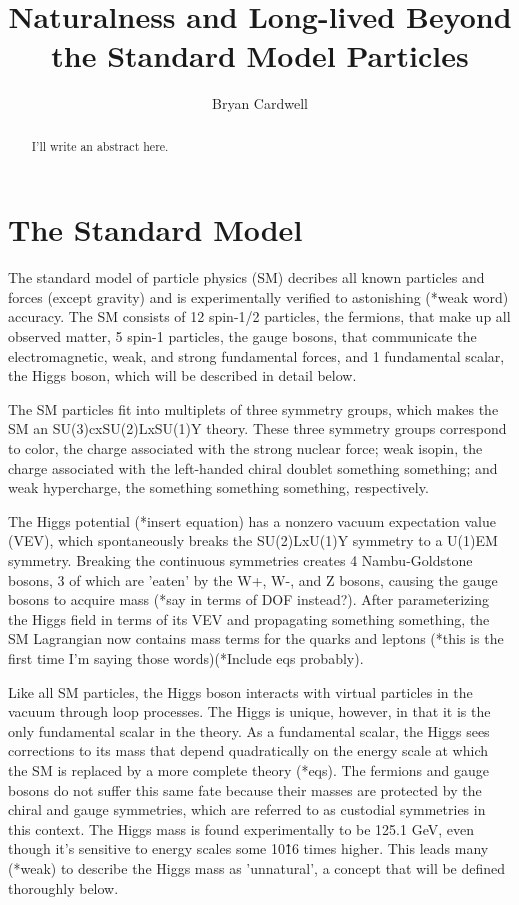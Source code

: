 \documentclass[12pt]{article}
\title{Naturalness and Long-lived Beyond the Standard Model Particles}
\author{Bryan Cardwell}
\begin{document}
\singlespacing

\maketitle

\begin{abstract}

I'll write an abstract here.

\end{abstract}

\doublespacing

\section{The Standard Model}
    The standard model of particle physics (SM) decribes all known particles and forces (except gravity) and is experimentally verified to astonishing (*weak word) accuracy. The SM consists of 12 spin-1/2 particles, the fermions, that make up all observed matter, 5 spin-1 particles, the gauge bosons, that communicate the electromagnetic, weak, and strong fundamental forces, and 1 fundamental scalar, the Higgs boson, which will be described in detail below.
    
    The SM particles fit into multiplets of three symmetry groups, which makes the SM an SU(3)cxSU(2)LxSU(1)Y theory. These three symmetry groups correspond to color, the charge associated with the strong nuclear force; weak isopin, the charge associated with the left-handed chiral doublet something something; and weak hypercharge, the something something something, respectively. 

    The Higgs potential (*insert equation) has a nonzero vacuum expectation value (VEV), which spontaneously breaks the SU(2)LxU(1)Y symmetry to a U(1)EM symmetry. Breaking the continuous symmetries creates 4 Nambu-Goldstone bosons, 3 of which are 'eaten' by the W+, W-, and Z bosons, causing the gauge bosons to acquire mass (*say in terms of DOF instead?). After parameterizing the Higgs field in terms of its VEV and propagating something something, the SM Lagrangian now contains mass terms for the quarks and leptons (*this is the first time I'm saying those words)(*Include eqs probably).

    Like all SM particles, the Higgs boson interacts with virtual particles in the vacuum through loop processes. The Higgs is unique, however, in that it is the only fundamental scalar in the theory. As a fundamental scalar, the Higgs sees corrections to its mass that depend quadratically on the energy scale at which the SM is replaced by a more complete theory (*eqs). The fermions and gauge bosons do not suffer this same fate because their masses are protected by the chiral and gauge symmetries, which are referred to as custodial symmetries in this context. The Higgs mass is found experimentally to be 125.1 GeV, even though it's sensitive to energy scales some 10\^16 times higher. This leads many (*weak) to describe the Higgs mass as 'unnatural', a concept that will be defined thoroughly below.
\end{document}
